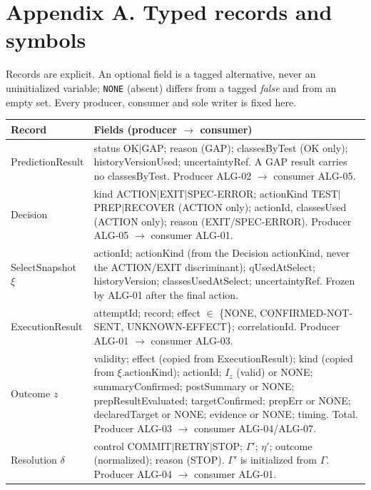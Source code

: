 
\section*{Appendix A. Typed records and symbols}
\label{app:cltav-types}

Records are explicit. An optional field is a tagged alternative, never an
uninitialized variable; \texttt{NONE} (absent) differs from a tagged \emph{false}
and from an empty set. Every producer, consumer and sole writer is fixed here.

\begin{table}[H]
\centering
\small
\begin{tabular}{@{}p{3.0cm}p{12.4cm}@{}}
\hline
Record & Fields (producer $\to$ consumer) \\
\hline
PredictionResult & status OK$\vert$GAP; reason (GAP); classesByTest (OK only); historyVersionUsed; uncertaintyRef. A GAP result carries no classesByTest. Producer ALG-02 $\to$ consumer ALG-05. \\
Decision & kind ACTION$\vert$EXIT$\vert$SPEC-ERROR; actionKind TEST$\vert$PREP$\vert$RECOVER (ACTION only); actionId, classesUsed (ACTION only); reason (EXIT/SPEC-ERROR). Producer ALG-05 $\to$ consumer ALG-01. \\
SelectSnapshot $\xi$ & actionId; actionKind (from the Decision actionKind, never the ACTION/EXIT discriminant); qUsedAtSelect; historyVersion; classesUsedAtSelect; uncertaintyRef. Frozen by ALG-01 after the final action. \\
ExecutionResult & attemptId; record; effect $\in$ \{NONE, CONFIRMED-NOT-SENT, UNKNOWN-EFFECT\}; correlationId. Producer ALG-01 $\to$ consumer ALG-03. \\
Outcome $z$ & validity; effect (copied from ExecutionResult); kind (copied from $\xi.\mathrm{actionKind}$); actionId; $I_z$ (valid) or NONE; summaryConfirmed; postSummary or NONE; prepResultEvaluated; targetConfirmed; prepErr or NONE; declaredTarget or NONE; evidence or NONE; timing. Total. Producer ALG-03 $\to$ consumer ALG-04/ALG-07. \\
Resolution $\delta$ & control COMMIT$\vert$RETRY$\vert$STOP; $\Gamma'$; $\eta'$; outcome (normalized); reason (STOP). $\Gamma'$ is initialized from $\Gamma$. Producer ALG-04 $\to$ consumer ALG-01. \\
\hline
\end{tabular}
\end{table}

